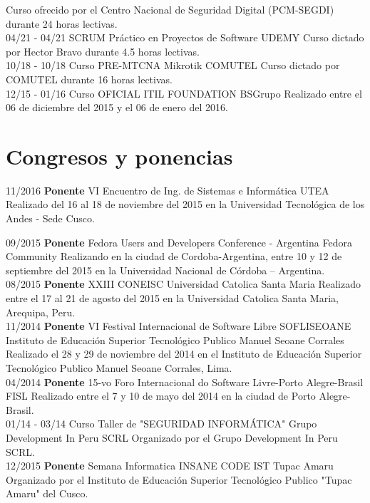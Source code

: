 \documentclass[]{friggeri-cv}
\begin{document}
\begin{entrylist}
    {Curso ofrecido por el Centro Nacional de Seguridad Digital (PCM-SEGDI) durante 24 horas lectivas.\\}
    \entry
    {04/21 - 04/21}
    {SCRUM Práctico en Proyectos de Software}
    {UDEMY}
    {Curso dictado por Hector Bravo durante 4.5 horas lectivas.\\}
    \entry
    {10/18 - 10/18}
    {Curso PRE-MTCNA Mikrotik}
    {COMUTEL}
    {Curso dictado por COMUTEL durante 16 horas lectivas.\\}
    \entry
    {12/15 - 01/16}
    {Curso OFICIAL ITIL FOUNDATION}
    {BSGrupo}
    {Realizado entre el 06 de diciembre del 2015 y el 06 de enero del 2016.\\}
\end{entrylist}

\section{Congresos y ponencias}
\begin{entrylist}
  \entry
    {11/2016}
    {\textbf{Ponente} VI Encuentro de Ing. de Sistemas e Inform\'atica }
    {UTEA}
    {Realizado del 16 al 18 de noviembre del 2015 en la Universidad Tecnológica de los Andes - Sede Cusco.\\}
\end{entrylist}
\begin{entrylist}
    \entry
    {09/2015}
    {\textbf{Ponente} Fedora Users and Developers Conference - Argentina}
    {Fedora Community}
    {Realizando en la ciudad de Cordoba-Argentina, entre 10 y 12 de septiembre
    del 2015 en la Universidad Nacional de C\'ordoba – Argentina.\\}
    \entry
    {08/2015}
    {\textbf{Ponente} {XXIII CONEISC}}
    {Universidad Catolica Santa Maria}
    {Realizado entre el 17 al 21 de agosto del 2015 en la Universidad Catolica Santa Maria, Arequipa, Peru.\\}
    \entry
    {11/2014}
    {\textbf{Ponente} VI Festival Internacional de Software Libre SOFLISEOANE}
    {Instituto de Educaci\'on Superior Tecnol\'ogico Publico Manuel Seoane Corrales}
    {Realizado el 28 y 29 de noviembre del 2014 en el Instituto de Educaci\'on Superior
    Tecnol\'ogico Publico Manuel Seoane Corrales, Lima.\\}
    \entry
    {04/2014}
    {\textbf{Ponente} 15-vo Foro Internacional do Software Livre-Porto Alegre-Brasil}
    {FISL}
    {Realizado entre el 7 y 10 de mayo del 2014 en la ciudad de Porto Alegre-Brasil.\\}
    \entry
    {01/14 - 03/14}
    {Curso Taller de "SEGURIDAD INFORM\'ATICA"}
    {Grupo Development In Peru SCRL}
    {Organizado por el Grupo Development In Peru SCRL.\\}
    \entry
    {12/2015}
    {\textbf{Ponente} Semana Informatica INSANE CODE}
    {IST Tupac Amaru}
    {Organizado por el Instituto de Educaci\'on Superior Tecnol\'ogico Publico "Tupac
    Amaru" del Cusco.}
\end{entrylist}
\end{document}
